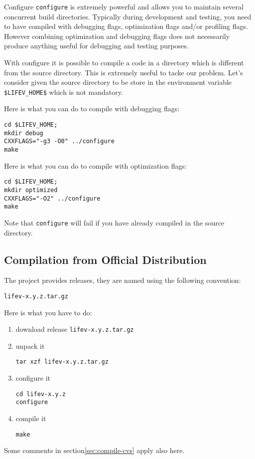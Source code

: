 \begin{hint}{Configure}
\verb!configure! is extremely powerful and allows you to maintain several concurrent build directories. Typically during development and testing, you need to have \lifev compiled with debugging flags, optimization flags and/or profiling flags. However combining optimization and debugging flags does not necessarily produce anything useful for debugging and testing purposes.

With configure it is possible to compile a code in a directory which is different from the source directory. This is extremely useful to tacke our problem. Let's consider given the source directory to be store in the environment variable \verb!$LIFEV_HOME$! which is not mandatory.

Here is what you can do to compile with debugging flags:
\begin{verbatim}
cd $LIFEV_HOME;
mkdir debug
CXXFLAGS="-g3 -O0" ../configure
make
\end{verbatim}

Here is what you can do to compile with optimization flags:
\begin{verbatim}
cd $LIFEV_HOME;
mkdir optimized
CXXFLAGS="-O2" ../configure
make
\end{verbatim}

Note that \verb!configure! will fail if you have already compiled \lifev in the source directory.
\end{hint}


\subsection{Compilation from Official Distribution}

The \lifev project provides releases, they are named using the following convention:
\begin{center}
\verb!lifev-x.y.z.tar.gz!
\end{center}

Here is what you have to do:

\begin{enumerate}
\item download \lifev release \verb!lifev-x.y.z.tar.gz!
\item unpack it
\begin{verbatim}
tar xzf lifev-x.y.z.tar.gz
\end{verbatim}
\item configure it
\begin{verbatim}
cd lifev-x.y.z
configure
\end{verbatim}
\item compile it
\begin{verbatim}
make
\end{verbatim}
\end{enumerate}

Some comments in section\ref{sec:compile-cvs} apply also here.


